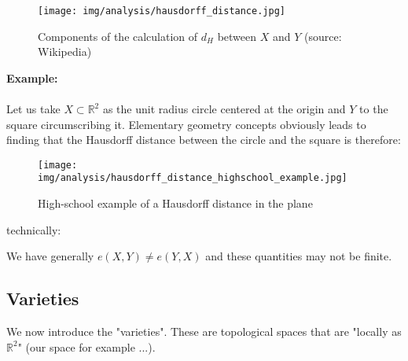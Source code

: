	\begin{figure}[H]
		\centering
		\texttt{[image: img/analysis/hausdorff\_distance.jpg]}
		\caption{Components of the calculation of $d_H$ between $X$ and $Y$ (source: Wikipedia)}
	\end{figure}
	\begin{tcolorbox}[colframe=black,colback=white,sharp corners]
	\textbf{{\Large {}}Example:}\\\\
	Let us take $X\subset \mathbb{R}^2$ as the unit radius circle centered at the origin and $Y$ to the square circumscribing it. Elementary geometry concepts obviously leads to finding that the Hausdorff distance between the circle and the square is therefore:
	\begin{figure}[H]
		\centering
		\texttt{[image: img/analysis/hausdorff\_distance\_highschool\_example.jpg]}
		\caption{High-school example of a Hausdorff distance in the plane}
	\end{figure}
	technically:
	
	\end{tcolorbox}
	\begin{tcolorbox}[title=Remark,colframe=black,arc=10pt]
	We have generally $e(X,Y)\neq e(Y,X)$ and these quantities may not be finite.
	\end{tcolorbox}
	
	\subsection{Varieties}
	We now introduce the "varieties". These are topological spaces that are "locally as $\mathbb{R}^2$" (our space for example ...).
	
